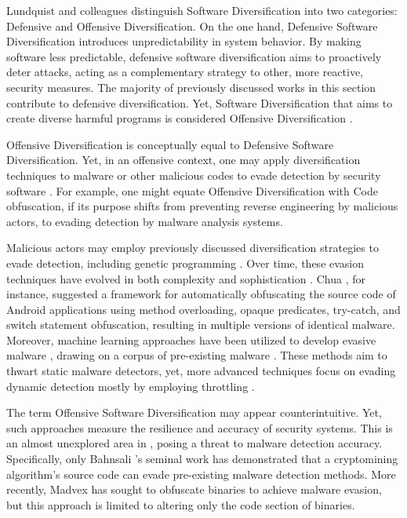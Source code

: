 \label{offensive_definition}
Lundquist and colleagues \cite{offensive_div} distinguish Software Diversification into two categories: Defensive and Offensive Diversification. 
On the one hand, Defensive Software Diversification introduces unpredictability in system behavior. 
By making software less predictable, defensive software diversification aims to proactively deter attacks, acting as a complementary strategy to other, more reactive, security measures. 
The majority of previously discussed works in this section contribute to defensive diversification.
Yet, Software Diversification that aims to create diverse harmful programs is considered Offensive Diversification \cite{fred1986computer}.


\begin{strategy}   
    Offensive Diversification is conceptually equal to Defensive Software Diversification.
    Yet, in an offensive context, one may apply diversification techniques to malware or other malicious codes to evade detection by security software \cite{8714698}.
    For example, one might equate Offensive Diversification with Code obfuscation, if its purpose shifts from preventing reverse engineering by malicious actors, to evading detection by malware analysis systems.
    
\end{strategy}


Malicious actors may employ previously discussed diversification strategies to evade detection, including genetic programming \cite{castro2019aimed}.
Over time, these evasion techniques have evolved in both complexity and sophistication \cite{Aghakhani2020WhenMI}.
Chua \etal \cite{chua}, for instance, suggested a framework for automatically obfuscating the source code of Android applications using method overloading, opaque predicates, try-catch, and switch statement obfuscation, resulting in multiple versions of identical malware.
Moreover, machine learning approaches have been utilized to develop evasive malware \cite{2021arXiv211111487D}, drawing on a corpus of pre-existing malware \cite{Bostani2021EvadeDroidAP}.
These methods aim to thwart static malware detectors, yet, more advanced techniques focus on evading dynamic detection mostly by employing throttling \cite{Lu2013WeaknessesID, payer2014embracing}.


The term Offensive Software Diversification may appear counterintuitive.
Yet, such approaches measure the resilience and accuracy of security systems. 
This is an almost unexplored area in \Wasm, posing a threat to malware detection accuracy. 
Specifically, only Bahnsali \etal's seminal work\cite{10.1145/3507657.3528560} has demonstrated that a cryptomining algorithm's source code can evade pre-existing malware detection methods. 
More recently, Madvex \cite{madvex} has sought to obfuscate \Wasm binaries to achieve malware evasion, but this approach is limited to altering only the code section of \Wasm binaries.



